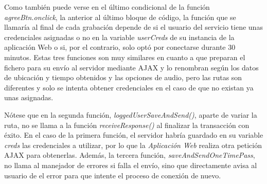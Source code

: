
Como también puede verse en el último condicional de la función \emph{agreeBtn.onclick}, la anterior al último bloque de código, la función que se llamaría al final de cada grabación depende de si el usuario del servicio tiene unas credenciales asignadas o no en la variable \emph{userCreds} de su instancia de la aplicación Web o si, por el contrario, solo optó por conectarse durante 30 minutos. Estas tres funciones son muy similares en cuanto a que preparan el fichero para su envío al servidor mediante AJAX y lo renombran según los datos de ubicación y tiempo obtenidos y las opciones de audio, pero las rutas son diferentes y solo se intenta obtener credenciales en el caso de que no existan ya unas asignadas.

Nótese que en la segunda función, \emph{loggedUserSaveAndSend()}, aparte de variar la ruta, no se llama a la función \emph{receiveResponse()} al finalizar la transacción con éxito. En el caso de la primera función, el servidor habría guardado en su variable \emph{creds} las credenciales a utilizar, por lo que la \emph{Aplicación Web} realiza otra petición AJAX para obtenerlas. Además, la tercera función, \emph{saveAndSendOneTimePass}, no llama al manejador de errores si falla el envío, sino que directamente avisa al usuario de el error para que intente el proceso de conexión de nuevo.

